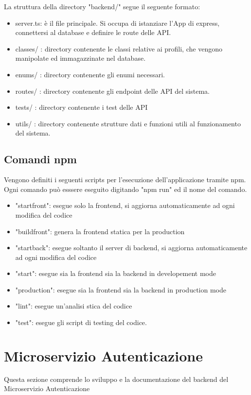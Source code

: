 \documentclass{report}
\begin{document}
La struttura della directory "backend/" segue il seguente formato:
\begin{itemize}
	\item server.ts: è il file principale. Si occupa di istanziare l'App di express, 
	connettersi al database e definire le route delle API.
	\item classes/ : directory contenente le classi relative ai profili, che vengono manipolate ed immagazzinate nel database.
	\item enums/ : directory contenente gli enumi necessari.
	\item routes/ : directory contenente gli endpoint delle API del sistema.
	\item tests/ : directory contenente i test delle API
	\item utils/ : directory contenente strutture dati e funzioni utili al funzionamento del sistema.
\end{itemize} 

\subsection{Comandi npm}
Vengono definiti i seguenti scripts per l'esecuzione dell'applicazione tramite npm. Ogni comando può esssere eseguito digitando "npm run" ed il nome del comando.
\begin{itemize}
	\item "startfront": esegue solo la frontend, si aggiorna automaticamente ad ogni modifica del codice
	\item "buildfront": genera la frontend statica per la production
	\item "startback": esegue soltanto il server di backend, si aggiorna automaticamente ad ogni modifica del codice
	\item "start": esegue sia la frontend sia la backend in developement mode
	\item "production": esegue sia la frontend sia la backend in production mode
	\item "lint": esegue un'analisi stica del codice
	\item "test": esegue gli script di testing del codice.
\end{itemize}


\section{Microservizio Autenticazione}

Questa sezione comprende lo sviluppo e la documentazione del backend del Microservizio Autenticazione
\end{document}
